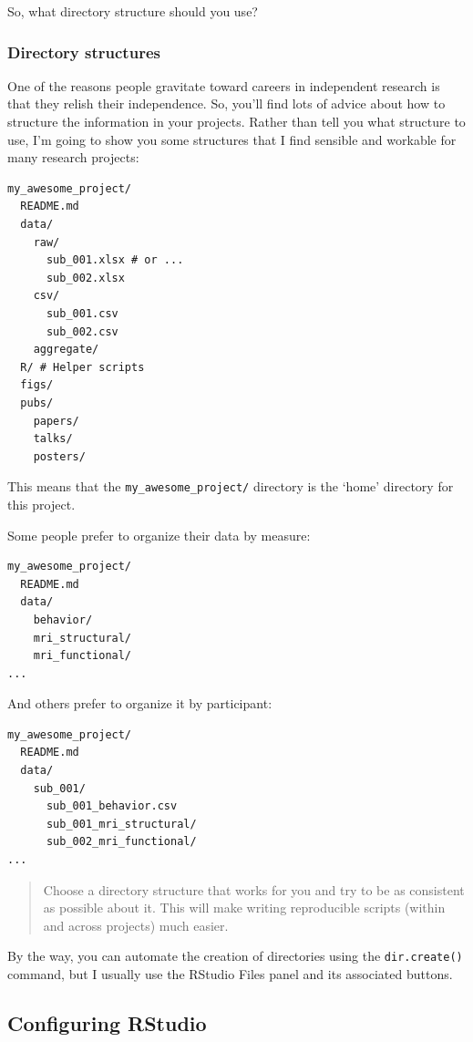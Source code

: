\documentclass[]{article}
\begin{document}
So, what directory structure should you use?

\subsubsection{Directory structures}\label{directory-structures}

One of the reasons people gravitate toward careers in independent
research is that they relish their independence. So, you'll find lots of
advice about how to structure the information in your projects. Rather
than tell you what structure to use, I'm going to show you some
structures that I find sensible and workable for many research projects:

\begin{verbatim}
my_awesome_project/
  README.md
  data/
    raw/
      sub_001.xlsx # or ...
      sub_002.xlsx
    csv/
      sub_001.csv
      sub_002.csv
    aggregate/
  R/ # Helper scripts
  figs/
  pubs/
    papers/
    talks/
    posters/
\end{verbatim}

This means that the \texttt{my\_awesome\_project/} directory is the
`home' directory for this project.

Some people prefer to organize their data by measure:

\begin{verbatim}
my_awesome_project/
  README.md
  data/
    behavior/
    mri_structural/
    mri_functional/
...
\end{verbatim}

And others prefer to organize it by participant:

\begin{verbatim}
my_awesome_project/
  README.md
  data/
    sub_001/
      sub_001_behavior.csv
      sub_001_mri_structural/
      sub_002_mri_functional/
...
\end{verbatim}

\begin{quote}
Choose a directory structure that works for you and try to be as
consistent as possible about it. This will make writing reproducible
scripts (within and across projects) much easier.
\end{quote}

By the way, you can automate the creation of directories using the
\texttt{dir.create()} command, but I usually use the RStudio Files panel
and its associated buttons.

\subsection{Configuring RStudio}\label{configuring-rstudio}
\end{document}
